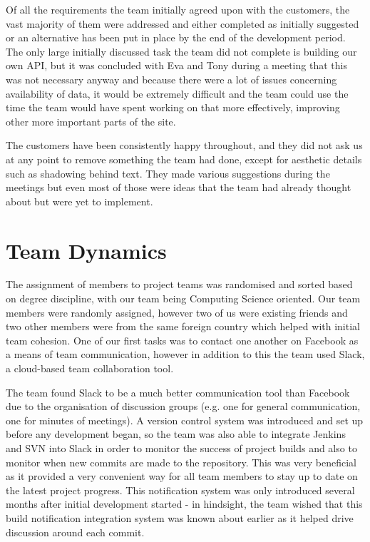 \documentclass{l3proj}
\begin{document}

Of all the requirements the team initially agreed upon with the customers, the vast majority of them were addressed and either completed as initially suggested or an alternative has been put in place by the end of the development period. The only large initially discussed task the team did not complete is building our own API, but it was concluded with Eva and Tony during a meeting that this was not necessary anyway and because there were a lot of issues concerning availability of data, it would be extremely difficult and the team could use the time the team would have spent working on that more effectively, improving other more important parts of the site.

The customers have been consistently happy throughout, and they did not ask us at any point to remove something the team had done, except for aesthetic details such as shadowing behind text. They made various suggestions during the meetings but even most of those were ideas that the team had already thought about but were yet to implement.

\section{Team Dynamics}
\label{sec:team-dynamics}

The assignment of members to project teams was randomised and sorted based on degree discipline, with our team being Computing Science oriented. Our team members were randomly assigned, however two of us were existing friends and two other members were from the same foreign country which helped with initial team cohesion. One of our first tasks was to contact one another on Facebook as a means of team communication, however in addition to this the team used Slack, a cloud-based team collaboration tool.

The team found Slack to be a much better communication tool than Facebook due to the organisation of discussion groups (e.g. one for general communication, one for minutes of meetings). A version control system was introduced and set up before any development began, so the team was also able to integrate Jenkins and SVN into Slack in order to monitor the success of project builds and also to monitor when new commits are made to the repository. This was very beneficial as it provided a very convenient way for all team members to stay up to date on the latest project progress. This notification system was only introduced several months after initial development started - in hindsight, the team wished that this build notification integration system was known about earlier as it helped drive discussion around each commit.
\end{document}
